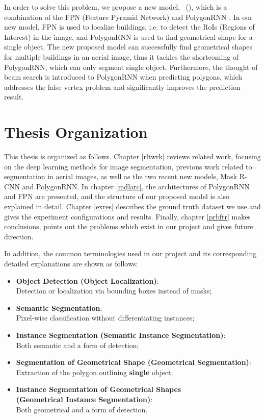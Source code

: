 In order to solve this problem, we propose a new model, \modelnameshort\ (\modelnamelong), which is a combination of the FPN (Feature Pyramid Network) \cite{fpn} and PolygonRNN \cite{polygonrnn}. In our new model, FPN is used to localize buildings, i.e. to detect the RoIs (Regions of Interest) in the image, and PolygonRNN is used to find geometrical shape for a single object. The new proposed model can successfully find geometrical shapes for multiple buildings in an aerial image, thus it tackles the shortcoming of PolygonRNN, which can only segment single object. Furthermore, the thought of beam search is introduced to PolygonRNN when predicting polygons, which addresses the false vertex problem and significantly improves the prediction result.

\section{Thesis Organization}\label{thsorg}
This thesis is organized as follows. Chapter \ref{rltwrk} reviews related work, focusing on the deep learning methods for image segmentation, previous work related to segmentation in aerial images, as well as the two recent new models, Mask R-CNN \cite{maskrcnn} and PolygonRNN. In chapter \ref{mdlarc}, the architectures of PolygonRNN and FPN are presented, and the structure of our proposed model is also explained in detail. Chapter \ref{exres} describes the ground truth dataset we use and gives the experiment configurations and results. Finally, chapter \ref{prbftr} makes conclusions, points out the problems which exist in our project and gives future direction.

In addition, the common terminologies used in our project and its corresponding detailed explanations are shown as follows:
\begin{itemize}
	\item \textbf{Object Detection (Object Localization)}:\\
	Detection or localization via bounding boxes instead of masks;
	\item \textbf{Semantic Segmentation}:\\
	Pixel-wise classification without differentiating instances;
	\item \textbf{Instance Segmentation (Semantic Instance Segmentation)}:\\
	Both semantic and a form of detection;
	\item \textbf{Segmentation of Geometrical Shape (Geometrical Segmentation)}:\\
	Extraction of the polygon outlining \textbf{single} object;
	\item \textbf{Instance Segmentation of Geometrical Shapes \\ (Geometrical Instance Segmentation)}:\\
	Both geometrical and a form of detection.
\end{itemize}

